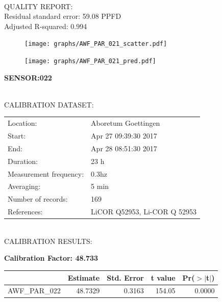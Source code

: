 \documentclass[oneside]{report}
\begin{document}
\hrulefill\\
QUALITY REPORT:\\
Residual standard error: 59.08 PPFD\\
Adjusted R-squared: 0.994



\begin{figure}[H]
  \centering
  \texttt{[image: graphs/AWF\_PAR\_021\_scatter.pdf]}
\end{figure}




\begin{figure}[H]
  \centering
  \texttt{[image: graphs/AWF\_PAR\_021\_pred.pdf]}
\end{figure}

\pagebreak


\begin{center}
\large{\textbf{SENSOR:022}}\\
\end{center}

\hrulefill\\
CALIBRATION DATASET:\\
\begin{table}[h!]
  \centering
  \label{tab:table1}
  \begin{tabular}{ll}
    Location: & Aboretum Goettingen\\ 
    
    
    Start:  & Apr 27 09:39:30 2017 \\
    End:   & Apr 28 08:51:30 2017\\ 
    Duration: & 23 h\\
    Measurement frequency: & 0.3hz\\
    Averaging:  &5 min\\
    Number of records: & 169 \\
    References: & LiCOR Q52953, Li-COR Q 52953 \\
  \end{tabular}
\end{table}

\hrulefill\\
CALIBRATION RESULTS:\\


\begin{center}
\textbf{\large{Calibration Factor: 48.733}}\\
\end{center}
\begin{table}[ht]
\centering
\begin{tabular}{rrrrr}
  \hline
 & Estimate & Std. Error & t value & Pr($>$$|$t$|$) \\ 
  \hline
AWF\_PAR\_022 & 48.7329 & 0.3163 & 154.05 & 0.0000 \\ 
   \hline
\end{tabular}
\end{table}
\end{document}
